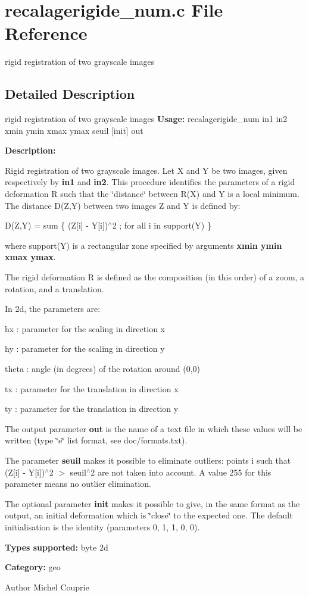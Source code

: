 \section{recalagerigide\_\-num.c File Reference}
\label{recalagerigide__num_8c}


rigid registration of two grayscale images  




\subsection{Detailed Description}
rigid registration of two grayscale images {\bfseries Usage:} recalagerigide\_\-num in1 in2 xmin ymin xmax ymax seuil [init] out

{\bfseries Description:}

Rigid registration of two grayscale images. Let X and Y be two images, given respectively by {\bfseries in1} and {\bfseries in2}. This procedure identifies the parameters of a rigid deformation R such that the \char`\"{}distance\char`\"{} between R(X) and Y is a local minimum. The distance D(Z,Y) between two images Z and Y is defined by:

D(Z,Y) = sum \{ (Z[i] -\/ Y[i])$^\wedge$2 ; for all i in support(Y) \}

where support(Y) is a rectangular zone specified by arguments {\bfseries xmin ymin xmax ymax}.

The rigid deformation R is defined as the composition (in this order) of a zoom, a rotation, and a translation.

In 2d, the parameters are: \begin{DoxyItemize}
\item hx : parameter for the scaling in direction x \item hy : parameter for the scaling in direction y \item theta : angle (in degrees) of the rotation around (0,0) \item tx : parameter for the translation in direction x \item ty : parameter for the translation in direction y\end{DoxyItemize}
The output parameter {\bfseries out} is the name of a text file in which these values will be written (type \char`\"{}e\char`\"{} list format, see doc/formats.txt).

The parameter {\bfseries seuil} makes it possible to eliminate outliers: points i such that (Z[i] -\/ Y[i])$^\wedge$2 $>$ seuil$^\wedge$2 are not taken into account. A value 255 for this parameter means no outlier elimination.

The optional parameter {\bfseries init} makes it possible to give, in the same format as the output, an initial deformation which is \char`\"{}close\char`\"{} to the expected one. The default initialisation is the identity (parameters 0, 1, 1, 0, 0).

{\bfseries Types supported:} byte 2d

{\bfseries Category:} geo

\begin{DoxyAuthor}{Author}
Michel Couprie 
\end{DoxyAuthor}

